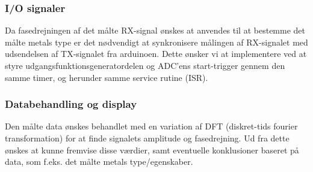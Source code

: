 \documentclass[../main.tex]{subfiles}
\begin{document}
\subsubsection{I/O signaler}
Da fasedrejningen af det målte RX-signal ønskes at anvendes til at bestemme det målte metals type er det nødvendigt at synkronisere målingen af RX-signalet med udsendelsen af TX-signalet fra arduinoen. Dette ønsker vi at implementere ved at styre udgangsfunktionsgeneratordelen og ADC'ens start-trigger gennem den samme timer, og herunder samme service rutine (ISR).

\subsubsection{Databehandling og display}
Den målte data ønskes behandlet med en variation af DFT (diskret-tids fourier transformation) for at finde signalets amplitude og fasedrejning. Ud fra dette ønskes at kunne fremvise disse værdier, samt eventuelle konklusioner baseret på data, som f.eks. det målte metals type/egenskaber.
\end{document}
